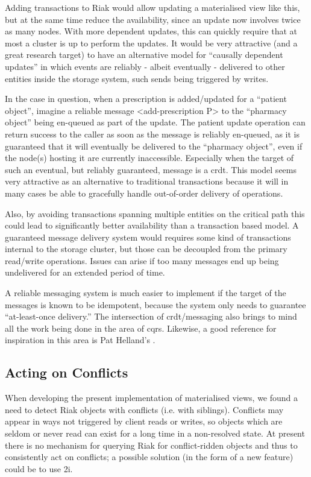 \documentclass[english]{article}
\begin{document}
Adding transactions to Riak would allow updating a materialised view like this, but at the same time reduce the availability, since an update now involves twice as many nodes. With more dependent updates, this can quickly require that at most a cluster is up to perform the updates.  It would be very attractive (and a great research target) to have an alternative model for ``causally dependent updates'' in which events are reliably - albeit eventually - delivered to other entities inside the storage system, such sends being triggered by writes.

In the case in question, when a prescription is added/updated for a ``patient object'', imagine a reliable message <add-prescription P> to the ``pharmacy object'' being en-queued as part of the update. The patient update operation can return success to the caller as soon as the message is reliably en-queued, as it is guaranteed that it will eventually be delivered to the ``pharmacy object'', even if the node(s) hosting it are currently inaccessible. Especially when the target of such an eventual, but reliably guaranteed, message is a \gls{crdt}. This model seems very attractive as an alternative to traditional transactions because it will in many cases be able to gracefully handle out-of-order delivery of operations.

Also, by avoiding transactions spanning multiple entities on the critical path this could lead to significantly better availability than a transaction based model. A guaranteed message delivery system would requires some kind of transactions internal to the storage cluster, but those can be decoupled from the primary read/write operations. Issues can arise if too many messages end up being undelivered for an extended period of time.

A reliable messaging system is much easier to implement if the target of the messages is known to be idempotent, because the system only needs to guarantee ``at-least-once delivery.'' The intersection of \gls{crdt}/messaging also brings to mind all the work being done in the area of \gls{cqrs}. Likewise, a good reference for inspiration in this area is Pat Helland's \cite{helland2007life}. 


\subsection{Acting on Conflicts}

When developing the present implementation of materialised views, we found a need to detect Riak objects with conflicts (i.e. with siblings). Conflicts may appear in ways not triggered by client reads or writes, so objects which are seldom or never read can exist for a long time
in a non-resolved state. At present there is no mechanism for querying Riak for conflict-ridden objects and thus to consistently act on conflicts; a possible solution (in the form of a new feature) could be to use \gls{2i}.
\end{document}
